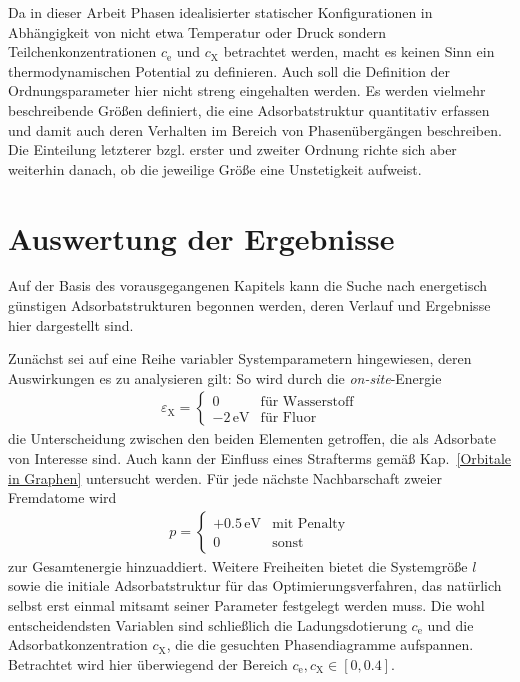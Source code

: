 \documentclass[a4paper, 10pt, twoside, openany]{book} %
\def \eX {\varepsilon_\mathrm{X}}
\def \cE {c_\mathrm{e}}
\def \cX {c_\mathrm{X}}
\begin{document}
	Da in dieser Arbeit Phasen idealisierter statischer Konfigurationen in Abhängigkeit von nicht etwa Temperatur oder Druck sondern Teilchenkonzentrationen $\cE$ und $\cX$ betrachtet werden, macht es keinen Sinn ein thermodynamischen Potential zu definieren. Auch soll die Definition der Ordnungsparameter hier nicht streng eingehalten werden. Es werden vielmehr beschreibende Größen definiert, die eine Adsorbatstruktur quantitativ erfassen und damit auch deren Verhalten im Bereich von Phasenübergängen beschreiben. Die Einteilung letzterer bzgl. erster und zweiter Ordnung richte sich aber weiterhin danach, ob die jeweilige Größe eine Unstetigkeit aufweist.
	
	\chapter{Auswertung der Ergebnisse}
	\label{Ergebnisse}
	
	Auf der Basis des vorausgegangenen Kapitels kann die Suche nach energetisch günstigen Adsorbatstrukturen begonnen werden, deren Verlauf und Ergebnisse hier dargestellt sind.
	
	Zunächst sei auf eine Reihe variabler Systemparametern hingewiesen, deren Auswirkungen es zu analysieren gilt: So wird durch die \emph{on-site}-Energie
	\begin{align*}
		\eX = \begin{cases} 0 & \text{für Wasserstoff} \\ -2\,\mathrm{eV} & \text{für Fluor} \end{cases}
	\end{align*} 
	die Unterscheidung zwischen den beiden Elementen getroffen, die als Adsorbate von Interesse sind. Auch kann der Einfluss eines Strafterms gemäß Kap.~\ref{Orbitale in Graphen} untersucht werden. Für jede nächste Nachbarschaft zweier Fremdatome wird
	\begin{align*}
		p = \begin{cases} +0.5\,\mathrm{eV} & \text{mit Penalty} \\ 0 & \text{sonst} \end{cases}
	\end{align*}
	zur Gesamtenergie hinzuaddiert. Weitere Freiheiten bietet die Systemgröße $l$ sowie die initiale Adsorbatstruktur für das Optimierungsverfahren, das natürlich selbst erst einmal mitsamt seiner Parameter festgelegt werden muss. Die wohl entscheidendsten Variablen sind schließlich die Ladungsdotierung $\cE$ und die Adsorbatkonzentration $\cX$, die die gesuchten Phasendiagramme aufspannen. Betrachtet wird hier überwiegend der Bereich $\cE, \cX \in [0, 0.4]$.
	
\end{document}
